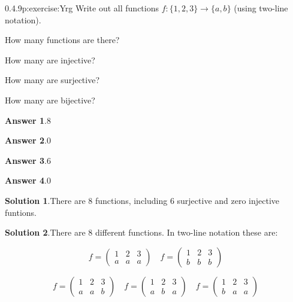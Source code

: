 \documentclass[twoside,11pt,]{book}
\newcommand{\blocktitlefont}{\relax}
\numberwithin{equation}{chapter}
\newcommand{\amp}{&}
\begin{document}
\begin{divisionsolution}{0.4.9}{}{p:exercise:Yrg}%
Write out all functions \(f: \{1,2,3\} \to \{a,b\}\) (using two-line notation).%
\par
How many functions are there?%
\par
How many are injective?%
\par
How many are surjective?%
\par
How many are bijective?%
\par\smallskip%
\noindent\textbf{\blocktitlefont Answer 1}.\quad{}\(8\)%
\par\smallskip%
\noindent\textbf{\blocktitlefont Answer 2}.\quad{}\(0\)%
\par\smallskip%
\noindent\textbf{\blocktitlefont Answer 3}.\quad{}\(6\)%
\par\smallskip%
\noindent\textbf{\blocktitlefont Answer 4}.\quad{}\(0\)%
\par\smallskip%
\noindent\textbf{\blocktitlefont Solution 1}.\quad{}There are 8 functions, including 6 surjective and zero injective funtions.%
\par\smallskip%
\noindent\textbf{\blocktitlefont Solution 2}.\quad{}There are 8 different functions. In two-line notation these are:%
\par
%
\begin{equation*}
f = \begin{pmatrix} 1 \amp 2 \amp 3 \\ a \amp a\amp a \end{pmatrix} \quad f = \begin{pmatrix} 1 \amp 2 \amp 3 \\ b \amp b \amp b \end{pmatrix}
\end{equation*}
%
\par
%
\begin{equation*}
f = \begin{pmatrix} 1 \amp 2 \amp 3 \\ a \amp a\amp b \end{pmatrix} \quad f = \begin{pmatrix} 1 \amp 2 \amp 3 \\ a \amp b \amp a \end{pmatrix} \quad f = \begin{pmatrix} 1 \amp 2 \amp 3 \\ b \amp a\amp a \end{pmatrix}
\end{equation*}
%
\par

\end{divisionsolution}
\end{document}
